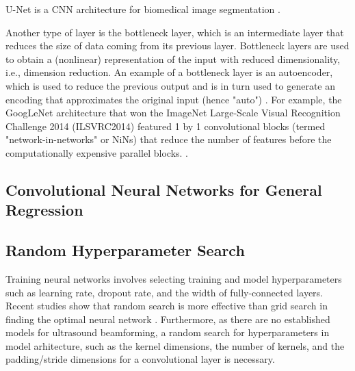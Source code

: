       U-Net is a CNN architecture for biomedical image segmentation \cite{ronneberger2015unet}.

      Another type of layer is the bottleneck layer, which is an intermediate layer that reduces the size of data coming from its previous layer. Bottleneck layers are used to obtain a (nonlinear) representation of the input with reduced dimensionality, i.e., dimension reduction. An example of a bottleneck layer is an autoencoder, which is used to reduce the previous output and is in turn used to generate an encoding that approximates the original input (hence "auto") \cite{ballard1987modular}. For example, the GoogLeNet architecture that won the ImageNet Large-Scale Visual Recognition Challenge 2014 (ILSVRC2014) featured 1 by 1 convolutional blocks (termed "network-in-networks" or NiNs) that reduce the number of features before the computationally expensive parallel blocks. \cite{szegedy2015going}.

    \subsection{Convolutional Neural Networks for General Regression}

    \subsection{Random Hyperparameter Search}
      Training neural networks involves selecting training and model hyperparameters such as learning rate, dropout rate, and the width of fully-connected layers. Recent studies show that random search is more effective than grid search in finding the optimal neural network \cite{bergstra2012random}. Furthermore, as there are no established models for ultrasound beamforming, a random search for hyperparameters in model arhitecture, such as the kernel dimensions, the number of kernels, and the padding/stride dimensions for a convolutional layer is necessary.

